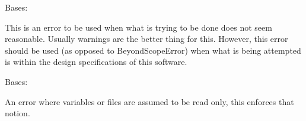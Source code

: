 \documentclass[letterpaper,11pt,english]{sphinxmanual}
\begin{document}
\begin{savenotes}\begin{fulllineitems}
\label{\detokenize{code/opihiexarata.library.error:opihiexarata.library.error.PracticalityError}}
\pysigstartsignatures
{}
\pysigstopsignatures
\sphinxAtStartPar
Bases: {\hyperref[\detokenize{code/opihiexarata.library.error:opihiexarata.library.error.ExarataException}]{}}

\sphinxAtStartPar
This is an error to be used when what is trying to be done does not
seem reasonable. Usually warnings are the better thing for this. However,
this error should be used (as opposed to BeyondScopeError) when what
is being attempted is within the design specifications of this software.

\end{fulllineitems}\end{savenotes}


\begin{savenotes}\begin{fulllineitems}
\label{\detokenize{code/opihiexarata.library.error:opihiexarata.library.error.ReadOnlyError}}
\pysigstartsignatures
{}
\pysigstopsignatures
\sphinxAtStartPar
Bases: {\hyperref[\detokenize{code/opihiexarata.library.error:opihiexarata.library.error.ExarataException}]{}}

\sphinxAtStartPar
An error where variables or files are assumed to be read only, this
enforces that notion.

\end{fulllineitems}\end{savenotes}
\end{document}
